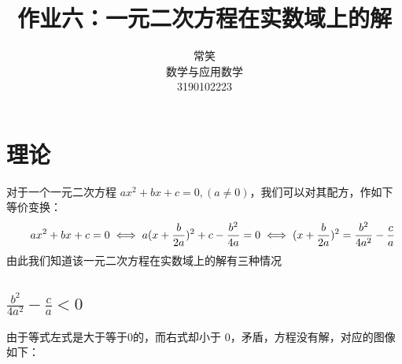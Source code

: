\documentclass{ctexart}
\title{作业六：一元二次方程在实数域上的解}
\author{常笑 \\ 数学与应用数学 \\ 3190102223 }
\begin{document}
\maketitle

\section{理论}
\indent 对于一个一元二次方程 $ax^2 + bx + c = 0,(a \neq 0) $，我们可以对其配方，作如下等价变换：
\begin{equation}
   \indent ax^2 + bx + c = 0 \\
   \iff a(x + \frac{b}{2a})^2 + c - \frac{b^2}{4a} = 0\\
   \iff (x + \frac{b}{2a})^2  = \frac{b^2}{4a^2} - \frac{c}{a}\\
\end{equation}
\indent 由此我们知道该一元二次方程在实数域上的解有三种情况
\subsection{$\frac{b^2}{4a^2} - \frac{c}{a} < 0$}
\indent 由于等式左式是大于等于$ 0 $的，而右式却小于 $0$，矛盾，方程没有解，对应的图像如下：
\begin{figure}[h]
\centering
{}
\caption{}
\end{figure}
\end{document}
